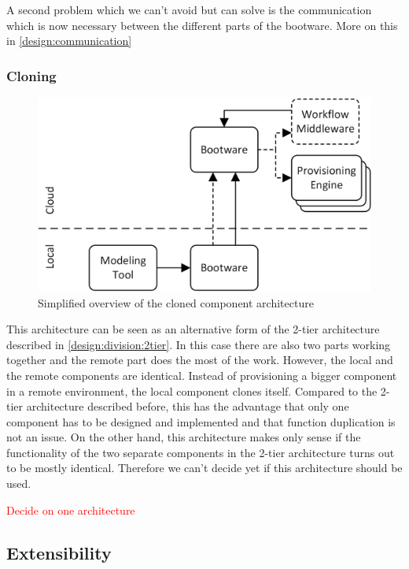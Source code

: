 A second problem which we can't avoid but can solve is the communication which is now necessary between the different parts of the bootware.
More on this in \autoref{design:communication}

\subsubsection{Cloning}

\begin{figure}[!htbp]
	\centering
	\includegraphics[resolution=600]{design/assets/simple_clone}
	\caption{Simplified overview of the cloned component architecture}
	\label{image:single_clone}
\end{figure}

This architecture can be seen as an alternative form of the 2-tier architecture described in \autoref{design:division:2tier}.
In this case there are also two parts working together and the remote part does the most of the work.
However, the local and the remote components are identical.
Instead of provisioning a bigger component in a remote environment, the local component clones itself.
Compared to the 2-tier architecture described before, this has the advantage that only one component has to be designed and implemented and that function duplication is not an issue.
On the other hand, this architecture makes only sense if the functionality of the two separate components in the 2-tier architecture turns out to be mostly identical.
Therefore we can't decide yet if this architecture should be used.

\textcolor{red}{Decide on one architecture}

\subsection{Extensibility}
\label{design:extensibility}

